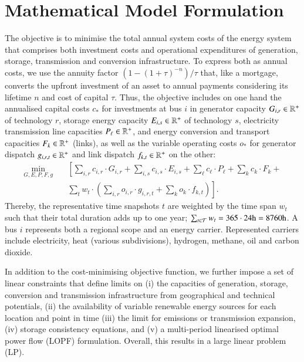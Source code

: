 \section{Mathematical Model Formulation}
\label{sec:si:math}

The objective is to minimise the total annual system costs of the energy system
that comprises both investment costs and operational expenditures of generation,
storage, transmission and conversion infrastructure. To express both as annual
costs, we use the annuity factor $(1-(1+\tau)^{-n}) / \tau$ that, like a
mortgage, converts the upfront investment of an asset to annual payments
considering its lifetime $n$ and cost of capital $\tau$. Thus, the objective
includes on one hand the annualised capital costs $c_*$ for investments at bus
$i$ in generator capacity $G_{i,r}\in\mathbb{R}^+$ of technology $r$, storage energy
capacity $E_{i,s}\in\mathbb{R}^+$ of technology $s$, electricity transmission line
capacities $P_{\ell}\in\mathbb{R}^+$, and energy conversion and transport capacities
$F_k\in\mathbb{R}^+$ (links), as well as the variable operating costs $o_*$ for
generator dispatch $g_{i,r,t}\in\mathbb{R}^+$ and link dispatch $f_{k,t}\in\mathbb{R}^+$ on the
other:
\begin{align}
  \label{eq:objective}
  \min_{G,E,P,F,g} \quad &\left[\sum_{i,r} c_{i,r}\cdot G_{i,r} + \sum_{i,s} c_{i,s}\cdot E_{i,s} + \sum_{\ell}c_{\ell}\cdot P_{\ell}+ \sum_{k}c_{k}\cdot F_k +\right. \\
  & \left.  \sum_{t} w_t \cdot \left( \sum_{i,r} o_{i,r} \cdot g_{i,r,t} + \sum_k o_k \cdot f_{k,t} \right) \right].
\end{align}
Thereby, the representative time snapshots $t$ are weighted by the time span
$w_t$ such that their total duration adds up to one year; \mbox{$\sum_{t\in \mathcal{T}}
w_t=365\cdot 24\text{h}=8760\text{h}$}. A bus $i$ represents both a regional
scope and an energy carrier. Represented carriers include electricity, heat
(various subdivisions), hydrogen, methane, oil and carbon dioxide.


In addition to the cost-minimising objective function, we further impose a set
of linear constraints that define limits on (i) the capacities of generation,
storage, conversion and transmission infrastructure from geographical and
technical potentials, (ii) the availability of variable renewable energy sources
for each location and point in time (iii) the limit for \co emissions or transmission expansion, (iv)
storage consistency equations, and (v) a multi-period linearised optimal power
flow (LOPF) formulation. Overall, this results in a large linear problem (LP).

